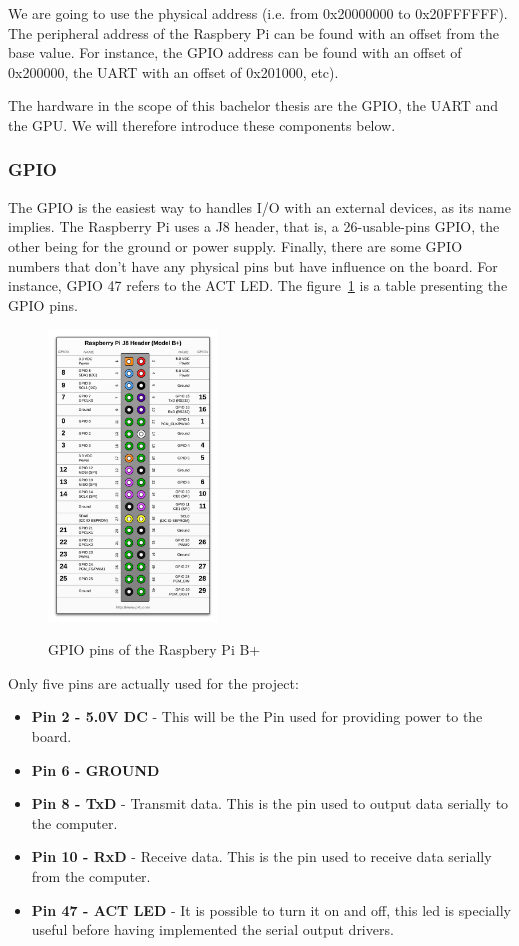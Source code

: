 We are going to use the physical address (i.e. from 0x20000000 to 0x20FFFFFF). The peripheral address of the Raspbery Pi can be found with an offset from the base value. For instance, the GPIO address can be found with an offset of 0x200000, the UART with an offset of 0x201000, etc).

The hardware in the scope of this bachelor thesis are the GPIO, the UART and the GPU. We will therefore introduce these components below.

\subsubsection{GPIO}
The GPIO is the easiest way to handles I/O with an external devices, as its name implies. The Raspberry Pi uses a J8 header, that is, a 26-usable-pins GPIO, the other being for the ground or power supply. Finally, there are some GPIO numbers that don't have any physical pins but have influence on the board. For instance, GPIO 47 refers to the ACT LED. The figure~\ref{fig:chapter2_GPIO_pins} is a table presenting the GPIO pins\cite{pi4j}.

\begin{figure}[H]
\begin{center}
\includegraphics[width=0.4\textwidth]{includes/figures/chapter2_GPIO_pins.png}  \\[0.5 cm]
\end{center}
\caption{GPIO pins of the Raspbery Pi B+}
\label{fig:chapter2_GPIO_pins}
\end{figure}

Only five pins are actually used for the project:
\begin{itemize}
\item\textbf{Pin 2 - 5.0V DC} - This will be the Pin used for providing power to the board.
\item\textbf{Pin 6 - GROUND}
\item\textbf{Pin 8 - TxD} - Transmit data. This is the pin used to output data serially to the computer.
\item\textbf{Pin 10 - RxD} - Receive data. This is the pin used to receive data serially from the computer.
\item\textbf{Pin 47 - ACT LED} - It is possible to turn it on and off, this led is specially useful before having implemented the serial output drivers.
\end{itemize}


